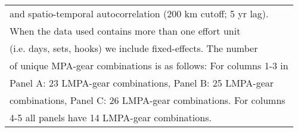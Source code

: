 \begin{table}
\begin{tabular}[t]{lcccccc}
\multicolumn{7}{l}{\rule{0pt}{1em}and spatio-temporal autocorrelation (200 km cutoff; 5 yr lag).}\\
\multicolumn{7}{l}{\rule{0pt}{1em}When the data used contains more than one effort unit}\\
\multicolumn{7}{l}{\rule{0pt}{1em}(i.e. days, sets, hooks) we include fixed-effects. The number}\\
\multicolumn{7}{l}{\rule{0pt}{1em}of unique MPA-gear combinations is as follows: For columns 1-3 in}\\
\multicolumn{7}{l}{\rule{0pt}{1em}Panel A: 23 LMPA-gear combinations, Panel B: 25 LMPA-gear}\\
\multicolumn{7}{l}{\rule{0pt}{1em}combinations, Panel C: 26 LMPA-gear combinations. For columns}\\
\multicolumn{7}{l}{\rule{0pt}{1em}4-5 all panels have 14 LMPA-gear combinations.}\\
\end{tabular}
\end{table}